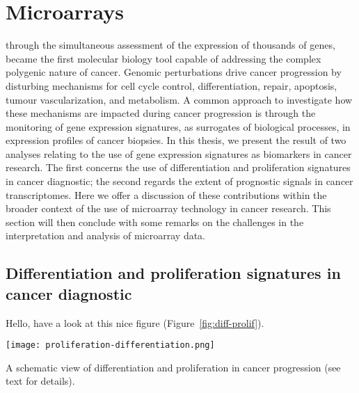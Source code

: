 \section{Microarrays}
\label{microarray-discussion}


 through the simultaneous assessment of the
expression of thousands of genes, became the first molecular biology tool
capable of addressing the complex polygenic nature of
cancer.\cite{grant_microarrays_2004} Genomic perturbations drive cancer
progression by disturbing mechanisms for cell cycle control, differentiation,
 repair, apoptosis, tumour vascularization, and metabolism.  A
common approach to investigate how these mechanisms are impacted during cancer
progression is through the monitoring of gene expression signatures, as
surrogates of biological processes, in expression profiles of cancer biopsies.
In this thesis, we present the result of two analyses relating to the use of
gene expression signatures as biomarkers in cancer research.  The first concerns
the use of differentiation and proliferation signatures in cancer diagnostic;
the second regards the extent of prognostic signals in cancer transcriptomes.
Here we offer a discussion of these contributions within the broader context of
the use of microarray technology in cancer research.  This section will then
conclude with some remarks on the challenges in the interpretation and analysis
of microarray data.

\subsection{Differentiation and proliferation signatures in cancer diagnostic}
\label{discussion-differentiation-microarrays}

Hello, have a look at this nice figure (Figure~\ref{fig:diff-prolif}).

\begin{marginfigure}%
  \begin{center}
    \texttt{[image: proliferation-differentiation.png]}
    \caption[Differentiation proliferation in cancer]{A schematic view of
      differentiation and proliferation in cancer progression (see text for
      details).}\label{fig:diff-prolif}%
  \end{center}
\end{marginfigure}%




